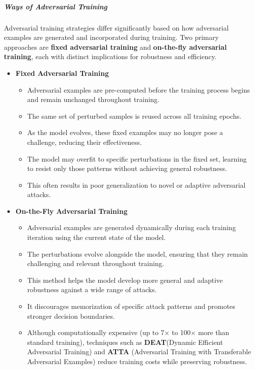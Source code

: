 \documentclass[../main.tex]{subfiles}
\begin{document}
\subparagraph{Ways of Adversarial Training} 

 Adversarial training strategies differ significantly based on how adversarial examples are generated and incorporated during training. Two primary approaches are \textbf{fixed adversarial training} and \textbf{on-the-fly adversarial training}, each with distinct implications for robustness and efficiency.
\begin{itemize}
    \item \textbf{Fixed Adversarial Training}
    \begin{itemize}
        \item Adversarial examples are pre-computed before the training process begins and remain unchanged throughout training.
        \item The same set of perturbed samples is reused across all training epochs.
        \item As the model evolves, these fixed examples may no longer pose a challenge, reducing their effectiveness.
        \item The model may overfit to specific perturbations in the fixed set, learning to resist only those patterns without achieving general robustness.
        \item This often results in poor generalization to novel or adaptive adversarial attacks.
    \end{itemize}

    \item \textbf{On-the-Fly Adversarial Training}
    \begin{itemize}
        \item Adversarial examples are generated dynamically during each training iteration using the current state of the model.
        \item The perturbations evolve alongside the model, ensuring that they remain challenging and relevant throughout training.
        \item This method helps the model develop more general and adaptive robustness against a wide range of attacks.
        \item It discourages memorization of specific attack patterns and promotes stronger decision boundaries.
        \item Although computationally expensive (up to 7× to 100× more than standard training), techniques such as \textbf{DEAT}(Dynamic Efficient Adversarial Training) and \textbf{ATTA} (Adversarial Training with Transferable Adversarial Examples) reduce training costs while preserving robustness.
    \end{itemize}
\end{itemize}
\end{document}
